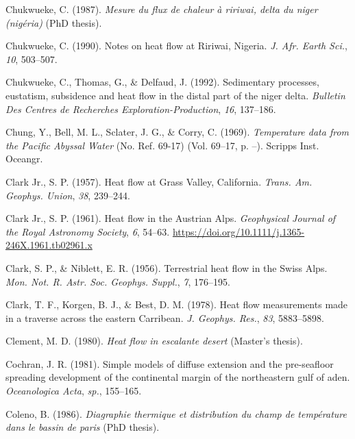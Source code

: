 \begin{CSLReferences}{1}{1}
\leavevmode{}%
Chukwueke, C. (1987). \emph{Mesure du flux de chaleur à ririwai, delta du niger (nigéria)} (PhD thesis).

\leavevmode{}%
Chukwueke, C. (1990). Notes on heat flow at {Ririwai, Nigeria}. \emph{J. Afr. Earth Sci.}, \emph{10}, 503--507.

\leavevmode{}%
Chukwueke, C., Thomas, G., \& Delfaud, J. (1992). Sedimentary processes, eustatism, subsidence and heat flow in the distal part of the niger delta. \emph{Bulletin Des Centres de Recherches Exploration-Production}, \emph{16}, 137--186.

\leavevmode{}%
Chung, Y., Bell, M. L., Sclater, J. G., \& Corry, C. (1969). \emph{Temperature data from the {Pacific Abyssal Water}} (No. Ref. 69-17) (Vol. 69--17, p. --). Scripps Inst. Oceangr.

\leavevmode{}%
Clark Jr., S. P. (1957). Heat flow at {Grass Valley, California}. \emph{Trans. Am. Geophys. Union}, \emph{38}, 239--244.

\leavevmode{}%
Clark Jr., S. P. (1961). Heat flow in the {Austrian Alps}. \emph{Geophysical Journal of the Royal Astronomy Society}, \emph{6}, 54--63. \url{https://doi.org/10.1111/j.1365-246X.1961.tb02961.x}

\leavevmode{}%
Clark, S. P., \& Niblett, E. R. (1956). Terrestrial heat flow in the {Swiss Alps}. \emph{Mon. Not. R. Astr. Soc. Geophys. Suppl.}, \emph{7}, 176--195.

\leavevmode{}%
Clark, T. F., Korgen, B. J., \& Best, D. M. (1978). Heat flow measurements made in a traverse across the eastern {Carribean}. \emph{J. Geophys. Res.}, \emph{83}, 5883--5898.

\leavevmode{}%
Clement, M. D. (1980). \emph{Heat flow in escalante desert} (Master's thesis).

\leavevmode{}%
Cochran, J. R. (1981). Simple models of diffuse extension and the pre-seafloor spreading development of the continental margin of the northeastern gulf of aden. \emph{Oceanologica Acta}, \emph{sp.}, 155--165.

\leavevmode{}%
Coleno, B. (1986). \emph{Diagraphie thermique et distribution du champ de température dans le bassin de paris} (PhD thesis).


\end{CSLReferences}
